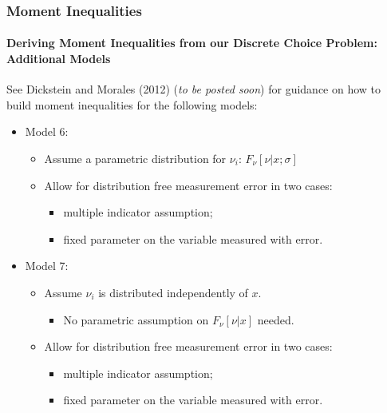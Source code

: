 \documentclass[10pt,letterpaper]{beamer}
\begin{document}
\begin{frame}
\frametitle{Moment Inequalities}
\framesubtitle{Deriving Moment Inequalities from our Discrete Choice Problem: Additional Models}

See Dickstein and Morales (2012) (\textit{to be posted soon}) for guidance on how to build moment inequalities for the following models:
	\begin{itemize}
		\item Model 6:
		\begin{itemize}
			\item Assume a parametric distribution for $\nu_{i}$: $F_{\nu}[\nu|x;\sigma]$
			\item Allow for distribution free measurement error in two cases:
			\begin{itemize}
				\item multiple indicator assumption; 
				\item fixed parameter on the variable measured with error.
			\end{itemize}
		\end{itemize}
		\item Model 7:
		\begin{itemize}
			\item Assume $\nu_{i}$ is distributed independently of $x$.
			\begin{itemize}
				\item No parametric assumption on $F_{\nu}[\nu|x]$ needed.
			\end{itemize}
			\item Allow for distribution free measurement error in two cases:
			\begin{itemize}
				\item multiple indicator assumption; 
				\item fixed parameter on the variable measured with error.
			\end{itemize}
		\end{itemize}	
	\end{itemize}
\end{frame}
\end{document}
